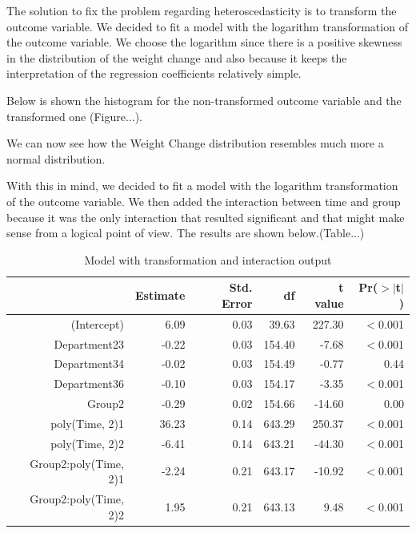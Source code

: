\documentclass{article}
\begin{document}
The solution to fix the problem regarding heteroscedasticity is to transform the outcome variable.
We decided to fit a model with the logarithm transformation of the outcome variable. We choose the logarithm since there is a positive skewness in the distribution of the weight change and also because it keeps the interpretation of the regression coefficients relatively simple.

Below is shown the histogram for the non-transformed outcome variable and the transformed one (Figure...).

We can now see how the Weight Change distribution resembles much more a normal distribution.




With this in mind, we decided to fit a model with the logarithm transformation of the outcome variable.
We then added the interaction between time and group because it was the only interaction that resulted significant and that might make sense from a logical point of view.
The results are shown below.(Table...)
 
 


\begin{table}[ht]
\centering
\caption{Model with transformation and interaction output}
\begin{tabular}{rrrrrr}
  \hline
 & Estimate & Std. Error & df & t value & Pr($>$$|$t$|$) \\ 
  \hline
(Intercept) & 6.09 & 0.03 & 39.63 & 227.30 & $<$0.001 \\ 
  Department23 & -0.22 & 0.03 & 154.40 & -7.68 & $<$0.001 \\ 
  Department34 & -0.02 & 0.03 & 154.49 & -0.77 & 0.44 \\ 
  Department36 & -0.10 & 0.03 & 154.17 & -3.35 & $<$0.001 \\ 
  Group2 & -0.29 & 0.02 & 154.66 & -14.60 & 0.00 \\ 
  poly(Time, 2)1 & 36.23 & 0.14 & 643.29 & 250.37 & $<$0.001 \\ 
  poly(Time, 2)2 & -6.41 & 0.14 & 643.21 & -44.30 & $<$0.001 \\ 
  Group2:poly(Time, 2)1 & -2.24 & 0.21 & 643.17 & -10.92 & $<$0.001 \\ 
  Group2:poly(Time, 2)2 & 1.95 & 0.21 & 643.13 & 9.48 & $<$0.001 \\ 
   \hline
\end{tabular}
\end{table}
\end{document}
